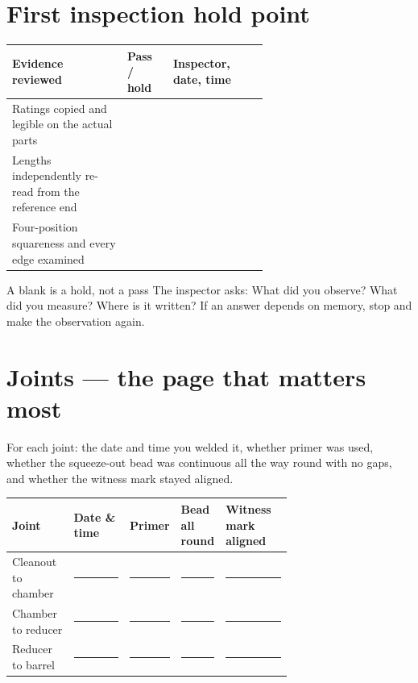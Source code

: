 \section{First inspection hold point}
\begin{tabularx}{\linewidth}{@{}p{0.45\linewidth}p{0.18\linewidth}L@{}}
\toprule
\textbf{Evidence reviewed} & \textbf{Pass / hold} & \textbf{Inspector, date, time}\\
\midrule
Ratings copied and legible on the actual parts & & \\[0.6em]
Lengths independently re-read from the reference end & & \\[1.1em]
Four-position squareness and every edge examined & & \\[1.1em]
\bottomrule
\end{tabularx}

\begin{gate}{A blank is a hold, not a pass}
The inspector asks: What did you observe? What did you measure? Where is it
written? If an answer depends on memory, stop and make the observation again.
\end{gate}

\newpage
\section{Joints --- the page that matters most}
For each joint: the date and time you welded it, whether primer was used,
whether the squeeze-out bead was continuous all the way round with no gaps, and
whether the witness mark stayed aligned.

\begin{tabularx}{\linewidth}{@{}p{0.22\linewidth}p{0.20\linewidth}p{0.11\linewidth}p{0.16\linewidth}L@{}}
\toprule
\textbf{Joint} & \textbf{Date \& time} & \textbf{Primer} & \textbf{Bead all round} & \textbf{Witness mark aligned}\\
\midrule
Cleanout to chamber & \rule{0.85\linewidth}{0.4pt} & \rule{0.7\linewidth}{0.4pt} & \rule{0.75\linewidth}{0.4pt} & \rule{0.8\linewidth}{0.4pt}\\[0.7em]
Chamber to reducer & \rule{0.85\linewidth}{0.4pt} & \rule{0.7\linewidth}{0.4pt} & \rule{0.75\linewidth}{0.4pt} & \rule{0.8\linewidth}{0.4pt}\\[0.7em]
Reducer to barrel & \rule{0.85\linewidth}{0.4pt} & \rule{0.7\linewidth}{0.4pt} & \rule{0.75\linewidth}{0.4pt} & \rule{0.8\linewidth}{0.4pt}\\
\bottomrule
\end{tabularx}


